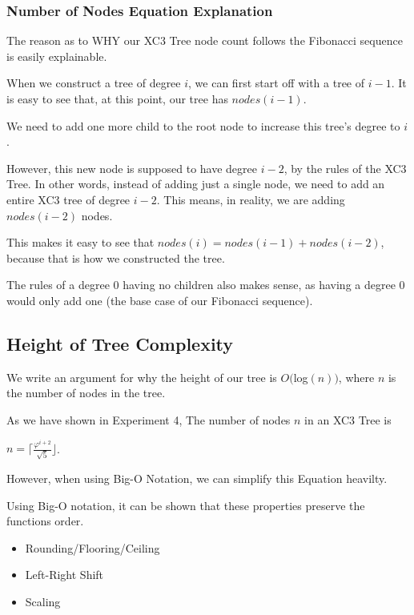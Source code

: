 \documentclass{article}
\begin{document}
\subsubsection{Number of Nodes Equation Explanation}

The reason as to WHY our XC3 Tree node count follows the Fibonacci sequence is easily explainable.

When we construct a tree of degree $i$, we can first start off with a tree of $i-1$. It is easy to see that, at this point, our tree has $nodes(i-1)$.


We need to add one more child to the root node to increase this tree's degree to $i$.

However, this new node is supposed to have degree $i-2$, by the rules of the XC3 Tree. In other words, instead of adding just a single node, we need to add an entire XC3 tree of degree $i-2$. This means, in reality, we are adding $nodes(i-2)$ nodes.

This makes it easy to see that $nodes(i) = nodes(i-1) + nodes(i-2)$, because that is how we constructed the tree.

The rules of a degree 0 having no children also makes sense, as having a degree 0 would only add one (the base case of our Fibonacci sequence).

\subsection{Height of Tree Complexity}

We write an argument for why the height of our tree is $O($log$(n))$, where $n$ is the number of nodes in the tree.

As we have shown in Experiment 4, The number of nodes $n$ in an XC3 Tree is
{
\begin{center}
    $n = \lceil \frac{\varphi^{i+2}}{\sqrt{5}} \rfloor$.\\
    $ $
\end{center}
}

However, when using Big-O Notation, we can simplify this Equation heavilty.

Using Big-O notation, it can be shown that these properties preserve the functions order.
\begin{itemize}
    \item Rounding/Flooring/Ceiling
    \item Left-Right Shift
    \item Scaling
\end{itemize}
\end{document}
